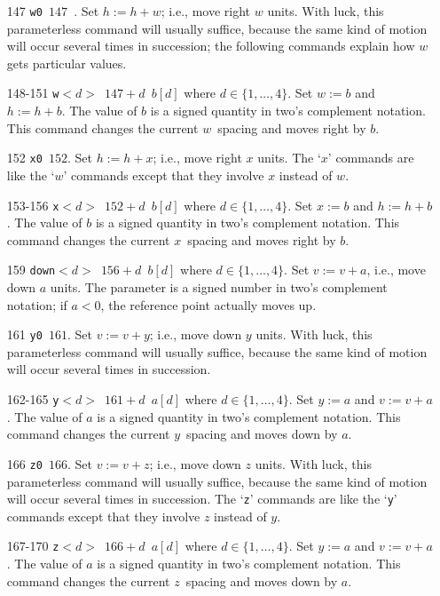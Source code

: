 \documentclass[10pt, a4paper]{article}
\begin{document}
\begin{itemize}
\item[147] \texttt{w0 $147$ }. 
Set $h:=h+w$; i.e., move right $w$ units. With luck,
this parameterless command will usually suffice, because the same kind of motion
will occur several times in succession; the following commands explain how
$w$ gets particular values. 

\item[148-151] \texttt{w$<d>$ $147+d$ $b[d]$} where $d\in\{1,\dots,4\}$. 
Set $w:=b$ and $h:=h+b$. 
The value of $b$ is a signed quantity in two's complement notation. 
This command changes the current $w$~spacing and moves right by $b$.


\item[152] \texttt{x0 $152$}. 
Set $h:=h+x$; i.e., move right $x$ units. The `$x$'
commands are like the `$w$' commands except that they involve $x$ instead
of $w$.

\item[153-156] \texttt{x$<d>$ $152+d$ $b[d]$} where $d\in\{1,\dots,4\}$. 
Set $x:=b$ and $h:=h+b$. 
The value of $b$ is a signed quantity in two's complement notation. 
This command changes the current $x$~spacing and moves right by $b$.


\item[159] \texttt{down$<d>$ $156+d$ $b[d]$} where $d\in\{1,\dots,4\}$. 
Set $v:=v+a$, i.e., move down $a$ units. 
The parameter is a signed number in two's complement notation; 
if $a<0$, the reference point actually moves up.


\item[161] \texttt{y0 $161$}. 
Set $v:=v+y$; i.e., move down $y$ units. 
With luck, this parameterless command will usually suffice, 
because the same kind of motion will occur several times in succession.

\item[162-165] \texttt{y$<d>$ $161+d$ $a[d]$} where $d\in\{1,\dots,4\}$. 
Set $y:=a$ and $v:=v+a$. 
The value of $a$ is a signed quantity in two's complement notation. 
This command changes the current $y$~spacing and moves down by $a$. 

\item[166] \texttt{z0 $166$}. 
Set $v:=v+z$; i.e., move down $z$ units. 
With luck, this parameterless command will usually suffice, 
because the same kind of motion will occur several times in succession.
The `\texttt{z}' commands are like the `\texttt{y}' commands 
except that they involve $z$ instead of $y$. 

\item[167-170] \texttt{z$<d>$ $166+d$ $a[d]$} where $d\in\{1,\dots,4\}$. 
Set $y:=a$ and $v:=v+a$. 
The value of $a$ is a signed quantity in two's complement notation. 
This command changes the current $z$~spacing and moves down by $a$. 



\end{itemize}
\end{document}
